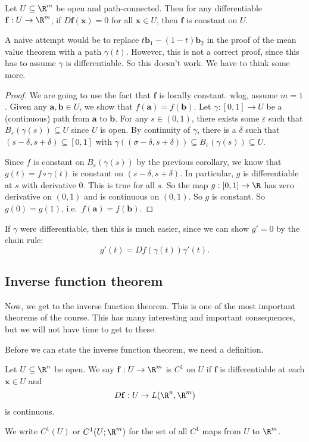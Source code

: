 \documentclass[a4paper]{article}
\begin{document}
\begin{thm}
  Let $U\subseteq \R^m$ be open and path-connected. Then for any differentiable $\mathbf{f}: U \to \R^m$, if $D\mathbf{f}(\mathbf{x}) = 0$ for all $\mathbf{x} \in U$, then $\mathbf{f}$ is constant on $U$.
\end{thm}
A naive attempt would be to replace $t\mathbf{b}_1 - (1 - t)\mathbf{b}_2$ in the proof of the mean value theorem with a path $\gamma(t)$. However, this is not a correct proof, since this has to assume $\gamma$ is differentiable. So this doesn't work. We have to think some more.

\begin{proof}
  We are going to use the fact that $\mathbf{f}$ is locally constant. wlog, assume $m = 1$. Given any $\mathbf{a}, \mathbf{b} \in U$, we show that $f(\mathbf{a}) = f(\mathbf{b})$. Let $\gamma: [0, 1] \to U$ be a (continuous) path from $\mathbf{a}$ to $\mathbf{b}$. For any $s \in (0, 1)$, there exists some $\varepsilon$ such that $B_\varepsilon(\gamma(s)) \subseteq U$ since $U$ is open. By continuity of $\gamma$, there is a $\delta$ such that $(s - \delta, s + \delta) \subseteq [0, 1]$ with $\gamma((\sigma - \delta, s + \delta)) \subseteq B_\varepsilon(\gamma(s)) \subseteq U$.

  Since $f$ is constant on $B_\varepsilon(\gamma(s))$ by the previous corollary, we know that $g(t) = f \circ \gamma (t)$ is constant on $(s - \delta, s + \delta)$. In particular, $g$ is differentiable at $s$ with derivative $0$. This is true for all $s$. So the map $g: [0, 1] \to \R$ has zero derivative on $(0, 1)$ and is continuous on $(0, 1)$. So $g$ is constant. So $g(0) = g(1)$, i.e.\ $f(\mathbf{a}) = f(\mathbf{b})$.
\end{proof}
If $\gamma$ were differentiable, then this is much easier, since we can show $g' = 0$ by the chain rule:
\[
  g'(t) = D f(\gamma(t)) \gamma'(t).
\]
\subsection{Inverse function theorem}
Now, we get to the inverse function theorem. This is one of the most important theorems of the course. This has many interesting and important consequences, but we will not have time to get to these.

Before we can state the inverse function theorem, we need a definition.
\begin{defi}[$C^1$ function]
  Let $U \subseteq \R^n$ be open. We say $\mathbf{f}: U \to \R^m$ is $C^1$ on $U$ if $\mathbf{f}$ is differentiable at each $\mathbf{x} \in U$ and
  \[
    D\mathbf{f}: U \to L(\R^n, \R^m)
  \]
  is continuous.

  We write $C^1(U)$ or $C^1(U; \R^m)$ for the set of all $C^1$ maps from $U$ to $\R^m$.
\end{defi}
\end{document}
